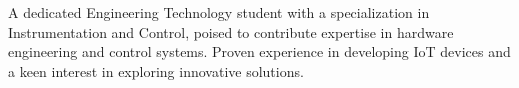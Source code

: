 

\begin{cvparagraph}

A dedicated Engineering Technology student with a specialization in Instrumentation and Control, poised to contribute expertise in hardware engineering and control systems. Proven experience in developing IoT devices and a keen interest in exploring innovative solutions.
\end{cvparagraph}